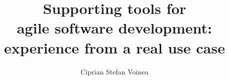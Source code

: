 
\title{Supporting tools for\\\vspace{-1.3cm}agile software development:\\experience from a real use case}
\author{Ciprian Stefan Voinea}
 


